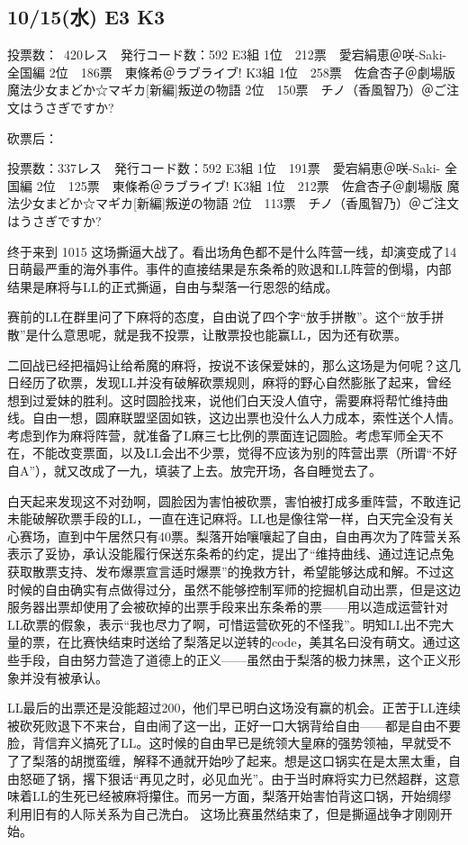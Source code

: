 \subsection{10/15(水) E3 K3}

	投票数：~420レス　発行コード数：592
	E3組
	1位　212票　愛宕絹恵＠咲-Saki- 全国編
	2位　186票　東條希＠ラブライブ!
	K3組
	1位　258票　佐倉杏子＠劇場版 魔法少女まどか☆マギカ[新編]叛逆の物語
	2位　150票　チノ（香風智乃）＠ご注文はうさぎですか?

砍票后：

	投票数：337レス　発行コード数：592
	E3組
	1位　191票　愛宕絹恵＠咲-Saki- 全国編
	2位　125票　東條希＠ラブライブ!
	K3組
	1位　212票　佐倉杏子＠劇場版 魔法少女まどか☆マギカ[新編]叛逆の物語
	2位　113票　チノ（香風智乃）＠ご注文はうさぎですか?

终于来到 1015 这场撕逼大战了。看出场角色都不是什么阵营一线，却演变成了14日萌最严重的海外事件。事件的直接结果是东条希的败退和LL阵营的倒塌，内部结果是麻将与LL的正式撕逼，自由与梨落一行恩怨的结成。

赛前的LL在群里问了下麻将的态度，自由说了四个字“放手拼散”。这个“放手拼散”是什么意思呢，就是我不投票，让散票投也能赢LL，因为还有砍票。

二回战已经把福妈让给希魔的麻将，按说不该保爱妹的，那么这场是为何呢？这几日经历了砍票，发现LL并没有破解砍票规则，麻将的野心自然膨胀了起来，曾经想到过爱妹的胜利。这时圆脸找来，说他们白天没人值守，需要麻将帮忙维持曲线。自由一想，圆麻联盟坚固如铁，这边出票也没什么人力成本，索性送个人情。考虑到作为麻将阵营，就准备了L麻三七比例的票面连记圆脸。考虑军师全天不在，不能改变票面，以及LL会出不少票，觉得不应该为别的阵营出票（所谓“不好自A”），就又改成了一九，填装了上去。放完开场，各自睡觉去了。

白天起来发现这不对劲啊，圆脸因为害怕被砍票，害怕被打成多重阵营，不敢连记未能破解砍票手段的LL，一直在连记麻将。LL也是像往常一样，白天完全没有关心赛场，直到中午居然只有40票。梨落开始嚷嚷起了自由，自由再次为了阵营关系表示了妥协，承认没能履行保送东条希的约定，提出了“维持曲线、通过连记点兔获取散票支持、发布爆票宣言适时爆票”的挽救方针，希望能够达成和解。不过这时候的自由确实有点做得过分，虽然不能够控制军师的挖掘机自动出票，但是这边服务器出票却使用了会被砍掉的出票手段来出东条希的票——用以造成运营针对LL砍票的假象，表示“我也尽力了啊，可惜运营砍死的不怪我”。明知LL出不完大量的票，在比赛快结束时送给了梨落足以逆转的code，美其名曰没有萌文。通过这些手段，自由努力营造了道德上的正义——虽然由于梨落的极力抹黑，这个正义形象并没有被承认。

LL最后的出票还是没能超过200，他们早已明白这场没有赢的机会。正苦于LL连续被砍死败退下不来台，自由闹了这一出，正好一口大锅背给自由——都是自由不要脸，背信弃义搞死了LL。这时候的自由早已是统领大皇麻的强势领袖，早就受不了了梨落的胡搅蛮缠，解释不通就开始吵了起来。想是这口锅实在是太黑太重，自由怒砸了锅，撂下狠话“再见之时，必见血光”。由于当时麻将实力已然超群，这意味着LL的生死已经被麻将攥住。而另一方面，梨落开始害怕背这口锅，开始绸缪利用旧有的人际关系为自己洗白。
这场比赛虽然结束了，但是撕逼战争才刚刚开始。

